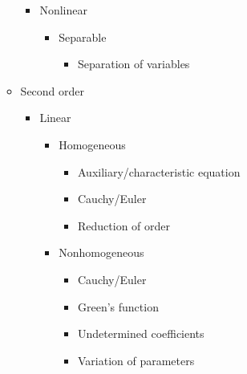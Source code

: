 \documentclass{article}
\begin{document}
\begin{itemize}
\begin{itemize}
\begin{itemize}
                  \item Nonlinear

                        \begin{itemize}
                          \item Separable

                                \begin{itemize}
                                  \item Separation of variables
                                \end{itemize}
                        \end{itemize}
                \end{itemize}

          \item Second order

                \begin{itemize}
                  \item Linear

                        \begin{itemize}
                          \item Homogeneous

                                \begin{itemize}
                                  \item Auxiliary/characteristic equation

                                  \item Cauchy/Euler

                                  \item Reduction of order
                                \end{itemize}

                          \item Nonhomogeneous

                                \begin{itemize}
                                  \item Cauchy/Euler

                                  \item Green's function

                                  \item Undetermined coefficients

                                  \item Variation of parameters
                                \end{itemize}
                        \end{itemize}


\end{itemize}
\end{itemize}
\end{itemize}
\end{document}
